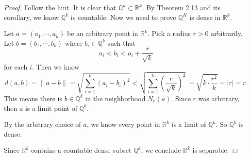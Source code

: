 \begin{Exercise}
	\begin{proof}
		Follow the hint. It is clear that $\mathbb{Q}^k\subset\mathbb{R}^k$. By Theorem 2.13 and its corollary, we know $\mathbb{Q}^k$ is countable. Now we need to prove $\mathbb{Q}^K$ is dense in $\mathbb{R}^k$.
		
		Let $a = (a_1,\cdots, a_k)$ be an arbitrary point in $\mathbb{R}^k$. Pick a radius $r > 0$ arbitrarily. Let $b = (b_1,\cdots, b_k)$ where $b_i\in\mathbb{Q}^k$ such that
		$$
		a_i < b_i < a_i+\frac{r}{\sqrt{k}}
		$$
		for each $i$. Then we know
		$$
		d(a,b)
		= \|a - b \| 
		= \sqrt{\sum_{i=1}^{k} (a_i-b_i)^2} 
		< \sqrt{\sum_{i=1}^{k} \left( \frac{r}{\sqrt{k}} \right)^2} \ 
		= \sqrt{k\cdot\frac{r^2}{k}}  
		= |r|
		= r.
		$$
		This means there is $b\in\mathbb{Q}^k$ in the neighborhood $N_r(a)$. Since $r$ was arbitrary, then $a$ is a limit point of $\mathbb{Q}^k$.
		
		By the arbitrary choice of $a$, we know every point in $\mathbb{R}^k$ is a limit of $\mathbb{Q}^k$. So $\mathbb{Q}^k$ is dense.
		
		Since $\mathbb{R}^k$ contains a countable dense subset $\mathbb{Q}^k$, we conclude $\mathbb{R}^k$ is separable.
	\end{proof}
\end{Exercise}
